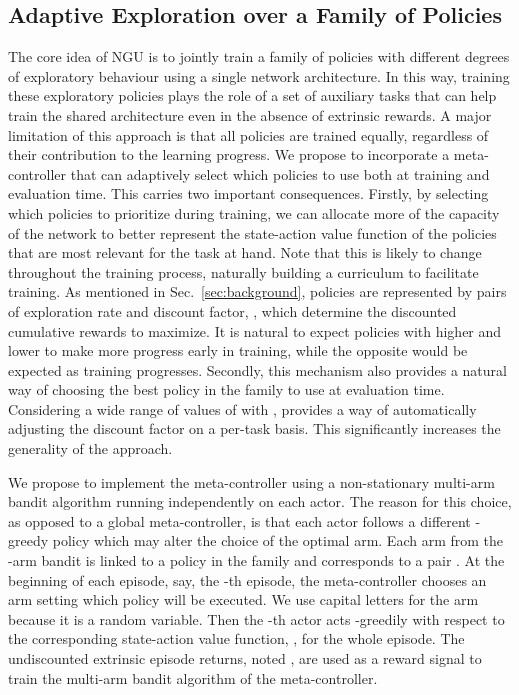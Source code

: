 \documentclass{article}
\begin{document}
\subsection{Adaptive Exploration over a Family of Policies}
\label{subsec:adaptive1}
The core idea of NGU is to jointly train a family of policies with different degrees of exploratory behaviour using a single network architecture.
In this way, training these exploratory policies plays the role of a set of auxiliary tasks that can help train the shared architecture even in the absence of extrinsic rewards.
A major limitation of this approach is that all policies are trained equally, regardless of their contribution to the learning progress. 
We propose to incorporate a meta-controller that can adaptively select which policies to use both at training and evaluation time.
This carries two important consequences. Firstly, by selecting which policies to prioritize during training, we can allocate more of the capacity of the network to better represent the state-action value function of the policies that are most relevant for the task at hand.
Note that this is likely to change throughout the training process, naturally building a curriculum to facilitate training.
As mentioned in Sec.~\ref{sec:background}, policies are represented by pairs of exploration rate and discount factor, , which determine the discounted cumulative rewards to maximize. It is natural to expect policies with higher  and lower  to make more progress early in training, while the opposite would be expected as training progresses.
Secondly, this mechanism also provides a natural way of choosing the best policy in the family to use at evaluation time.
Considering a wide range of values of  with , provides a way of automatically adjusting the discount factor on a per-task basis. This significantly increases the generality of the approach.

We propose to implement the meta-controller using a non-stationary multi-arm bandit algorithm running independently on each actor. The reason for this choice, as opposed to a global meta-controller, is that each actor follows a different -greedy policy which may alter the choice of the optimal arm.
Each arm  from the -arm bandit is linked to a policy in the family and corresponds to a pair .
At the beginning of each episode, say, the -th episode, the meta-controller chooses an arm  setting which policy will be executed. We use capital letters for the arm  because it is a random variable.
Then the -th actor acts -greedily with respect to the corresponding state-action value function, , for the whole episode. 
The undiscounted extrinsic episode returns, noted , are used as a reward signal to train the multi-arm bandit algorithm of the meta-controller. 
\end{document}

